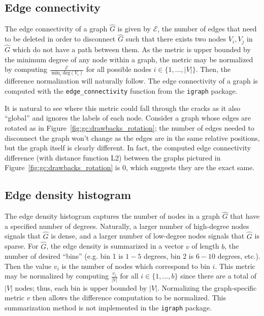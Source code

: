 \subsection{Edge connectivity}

The edge connectivity of a graph $\hat{G}$ is given by $\mathcal{E}$, the 
number of edges that need to be deleted in order to disconnect 
$\hat{G}$ such that there exists two nodes $V_i,V_j$ in $\hat{G}$ which do not 
have a path between them.
As the metric is upper bounded by the minimum 
degree of any node within a graph, the metric may be normalized by computing 
$\frac{\mathcal{E}}{\min_i \text{deg}(V_i)}$ for all possible nodes $i \in 
\{1,...,|V|\}$. Then, the difference normalization will naturally follow.
The edge connectivity of a graph is computed 
with the \texttt{edge\_connectivity} function from the \texttt{igraph} package. 

It is natural to see where this metric could fall through the cracks as it also 
``global'' and ignores the labels of each node. Consider 
a graph whose edges are rotated as in Figure~\ref{fig:gc:drawbacks_rotation}; 
the number of edges needed to disconnect the graph won't change as the edges 
are in the same relative positions, but the graph itself is clearly different. 
In fact, the computed edge connectivity difference (with distance function L2) 
between the graphs pictured in Figure~\ref{fig:gc:drawbacks_rotation} is 0, 
which suggests they are the exact same.

\subsection{Edge density histogram}

The edge density histogram captures the number of nodes in a graph $\hat{G}$ 
that have a 
specified number of degrees. Naturally, a larger number of high-degree nodes 
signals that $\hat{G}$ is dense, and a larger number of low-degree nodes 
signals that $\hat{G}$ is sparse. For 
$\hat{G}$, the edge density is summarized in a 
vector $v$ of length $b$, the number of desired ``bins'' 
(e.g. bin 1 is $1-5$ degrees, bin 2 is $6-10$ degrees, etc.). Then the value 
$v_i$ is the number of nodes which correspond to bin $i$. This 
metric may be normalized by computing $\frac{v_i}{|V|}$ for 
all $i \in \{1,...,b\}$ since there are a total of $|V|$ nodes; thus, each bin 
is upper bounded by $|V|$. Normalizing the graph-specific metric $v$ then
allows the difference computation to be normalized. 
This summarization method is not implemented in the \texttt{igraph} package. 

